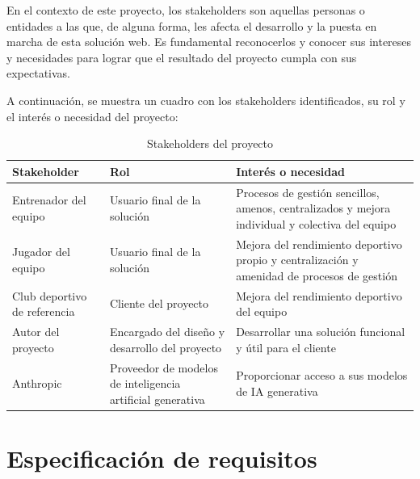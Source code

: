 En el contexto de este proyecto, los stakeholders son aquellas personas o entidades a las que, de alguna forma, les afecta el desarrollo y la puesta en marcha de esta solución web. Es fundamental reconocerlos y conocer sus intereses y necesidades para lograr que el resultado del proyecto cumpla con sus expectativas.

A continuación, se muestra un cuadro con los stakeholders identificados, su rol y el interés o necesidad del proyecto:

\begin{table}[ht]
  \centering
  \renewcommand{\arraystretch}{1.8}
  \begin{tabular}{|>{\centering\arraybackslash}p{3.5cm}|>{\centering\arraybackslash}p{5cm}|>{\centering\arraybackslash}p{5cm}|}
    \hline
    \rowcolor{headerblue}
    \textbf{Stakeholder}         & \textbf{Rol}                                               & \textbf{Interés o necesidad}                                                                    \\
    \hline
    Entrenador del equipo        & Usuario final de la solución                               & Procesos de gestión sencillos, amenos, centralizados y mejora individual y colectiva del equipo \\
    \hline
    Jugador del equipo           & Usuario final de la solución                               & Mejora del rendimiento deportivo propio y centralización y amenidad de procesos de gestión      \\
    \hline
    Club deportivo de referencia & Cliente del proyecto                                       & Mejora del rendimiento deportivo del equipo                                                     \\
    \hline
    Autor del proyecto           & Encargado del diseño y desarrollo del proyecto             & Desarrollar una solución funcional y útil para el cliente                                       \\
    \hline
    Anthropic                    & Proveedor de modelos de inteligencia artificial generativa & Proporcionar acceso a sus modelos de IA generativa                                              \\
    \hline
  \end{tabular}
  \caption{Stakeholders del proyecto}
  \label{tab:stakeholders}
\end{table}

\section{Especificación de requisitos}


